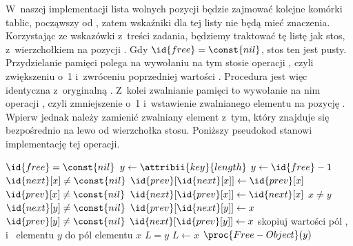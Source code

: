 \exercise %
W~naszej implementacji lista wolnych pozycji będzie zajmować kolejne komórki tablic, począwszy od , zatem wskaźniki  dla tej listy nie będą mieć znaczenia.
Korzystając ze wskazówki z~treści zadania, będziemy traktować tę listę jak stos, z~wierzchołkiem na pozycji .
Gdy $\id{free}=\const{nil}$, stos ten jest pusty.
Przydzielanie pamięci polega na wywołaniu na tym stosie operacji , czyli zwiększeniu  o~1 i~zwróceniu poprzedniej wartości .
Procedura  jest więc identyczna z~oryginalną .
Z~kolei zwalnianie pamięci to wywołanie na nim operacji , czyli zmniejszenie  o~1 i~wstawienie zwalnianego elementu na pozycję .
Wpierw jednak należy zamienić zwalniany element z~tym, który znajduje się bezpośrednio na lewo od wierzchołka stosu.
Poniższy pseudokod stanowi implementację tej operacji.
\begin{codebox}
\li	\If $\id{free}=\const{nil}$
\li		\Then $y\gets\attribii{key}{length}$
\li		\Else $y\gets\id{free}-1$
		\End
\li	\If $\id{next}[x]\ne\const{nil}$
\li		\Then $\id{prev}[\id{next}[x]]\gets\id{prev}[x]$
		\End
\li	\If $\id{prev}[x]\ne\const{nil}$
\li		\Then $\id{next}[\id{prev}[x]]\gets\id{next}[x]$
		\End
\li	\If $x\ne y$
\li		\Then \If $\id{next}[y]\ne\const{nil}$
\li				\Then $\id{prev}[\id{next}[y]]\gets x$
				\End
\li			\If $\id{prev}[y]\ne\const{nil}$
\li				\Then $\id{next}[\id{prev}[y]]\gets x$
				\End
		\End
\li	skopiuj wartości pól ,  i~ elementu $y$ do pól elementu $x$
\li	\If $L=y$
\li		\Then $L\gets x$
		\End
\li	$\proc{Free-Object}(y)$
\end{codebox}

